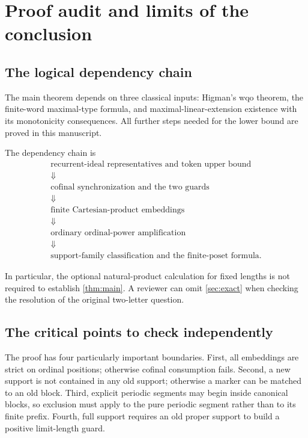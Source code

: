 \documentclass[11pt]{article}
\numberwithin{equation}{section}
\theoremstyle{plain}
\theoremstyle{definition}
\theoremstyle{remark}
\begin{document}
\section{Proof audit and limits of the conclusion}\label{sec:audit}

\subsection{The logical dependency chain}

The main theorem depends on three classical inputs: Higman's wqo theorem, the finite-word maximal-type formula, and maximal-linear-extension existence with its monotonicity consequences. All further steps needed for the lower bound are proved in this manuscript.

The dependency chain is
\[
 \begin{gathered}
 \text{recurrent-ideal representatives and token upper bound}\\
 \Downarrow\\
 \text{cofinal synchronization and the two guards}\\
 \Downarrow\\
 \text{finite Cartesian-product embeddings}\\
 \Downarrow\\
 \text{ordinary ordinal-power amplification}\\
 \Downarrow\\
 \text{support-family classification and the finite-poset formula.}
 \end{gathered}
\]

In particular, the optional natural-product calculation for fixed lengths is not required to establish \cref{thm:main}. A reviewer can omit \cref{sec:exact} when checking the resolution of the original two-letter question.

\subsection{The critical points to check independently}

The proof has four particularly important boundaries. First, all embeddings are strict on ordinal positions; otherwise cofinal consumption fails. Second, a new support is not contained in any old support; otherwise a marker can be matched to an old block. Third, explicit periodic segments may begin inside canonical blocks, so exclusion must apply to the pure periodic segment rather than to its finite prefix. Fourth, full support requires an old proper support to build a positive limit-length guard.
\end{document}
